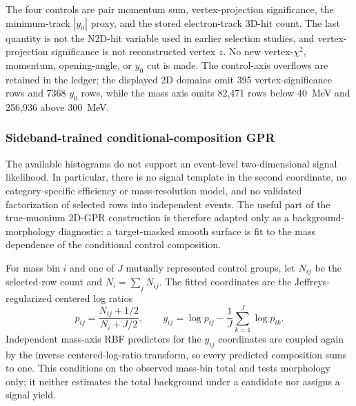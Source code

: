 The four controls are pair momentum sum, vertex-projection significance,
the minimum-track $|y_0|$ proxy, and the stored electron-track 3D-hit count.
The last quantity is not the N2D-hit variable used in earlier selection
studies, and vertex-projection significance is not reconstructed vertex
$z$.  No new vertex-$\chi^2$, momentum, opening-angle, or $y_0$ cut is made.
The control-axis overflows are retained in the ledger; the displayed 2D
domains omit 395 vertex-significance rows and 7368 $y_0$ rows, while the
mass axis omits 82,471 rows below 40~MeV and 256,936 above 300~MeV.

\subsubsection{Sideband-trained conditional-composition GPR}
\label{app:v4p3-composition-gpr-method}

The available histograms do not support an event-level two-dimensional
signal likelihood.  In particular, there is no signal template in the second
coordinate, no category-specific efficiency or mass-resolution model, and no
validated factorization of selected rows into independent events.  The useful
part of the true-muonium 2D-GPR construction is therefore adapted only as a
background-morphology diagnostic: a target-masked smooth surface is fit to
the mass dependence of the conditional control composition.

For mass bin $i$ and one of $J$ mutually represented control groups, let
$N_{ij}$ be the selected-row count and $N_i=\sum_jN_{ij}$.  The fitted
coordinates are the Jeffreys-regularized centered log ratios
\begin{equation}
 p_{ij}=\frac{N_{ij}+1/2}{N_i+J/2},\qquad
 y_{ij}=\log p_{ij}-\frac{1}{J}\sum_{k=1}^{J}\log p_{ik}.
 \label{eq:v4p3-clr-gpr}
\end{equation}
Independent mass-axis RBF predictors for the $y_{ij}$ coordinates are
coupled again by the inverse centered-log-ratio transform, so every predicted
composition sums to one.  This conditions on the observed mass-bin total and
tests morphology only; it neither estimates the total background under a
candidate nor assigns a signal yield.

